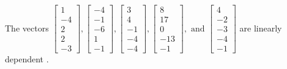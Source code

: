 \begin{exercise}
\begin{exerciseStatement}
  \end{exerciseStatement}
  \begin{exerciseAnswer}
   The vectors \(\left[\begin{array}{r}
1 \\
-4 \\
2 \\
2 \\
-3
\end{array}\right] , \left[\begin{array}{r}
-4 \\
-1 \\
-6 \\
1 \\
-1
\end{array}\right] , \left[\begin{array}{r}
3 \\
4 \\
-1 \\
-4 \\
-4
\end{array}\right] , \left[\begin{array}{r}
8 \\
17 \\
0 \\
-13 \\
-1
\end{array}\right] , \text{ and } \left[\begin{array}{r}
4 \\
-2 \\
-3 \\
-4 \\
-1
\end{array}\right]\) are 
  	 linearly dependent  .
  


  \end{exerciseAnswer}
\end{exercise}